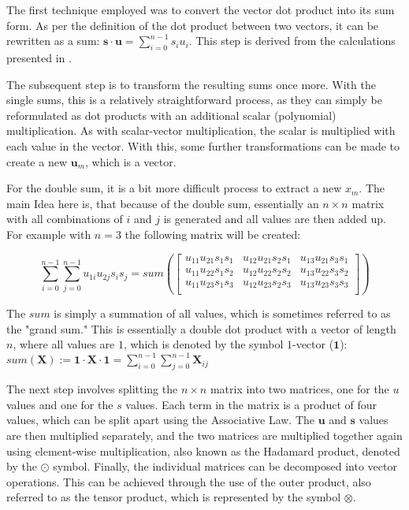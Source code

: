 The first technique employed was to convert the vector dot product into its sum form. As per the definition of the dot product between two vectors, it can be rewritten as a sum: $\textbf{s}\cdot \textbf{u} = \sum_{i=0}^{n-1}s_iu_i$. This step is derived from the calculations presented in \cite{ModHE}.

The subsequent step is to transform the resulting sums once more. With the single sums, this is a relatively straightforward process, as they can simply be reformulated as dot products with an additional scalar (polynomial) multiplication. As with scalar-vector multiplication, the scalar is multiplied with each value in the vector. With this, some further transformations can be made to create a new $\textbf{u}_m$, which is a vector. 

For the double sum, it is a bit more difficult process to extract a new $x_m$. The main Idea here is, that because of the double sum, essentially an $n\times n$ matrix with all combinations of $i$ and $j$ is generated and all values are then added up. For example with $n=3$ the following matrix will be created:

$$
  \sum_{i=0}^{n-1}\sum_{j=0}^{n-1}u_{1i}u_{2j}s_is_j = sum\left(\begin{bmatrix}
      u_{11}u_{21}s_{1}s_{1} & u_{12}u_{21}s_{2}s_{1} & u_{13}u_{21}s_{3}s_{1} \\
      u_{11}u_{22}s_{1}s_{2} & u_{12}u_{22}s_{2}s_{2} & u_{13}u_{22}s_{3}s_{2} \\
      u_{11}u_{23}s_{1}s_{3} & u_{12}u_{23}s_{2}s_{3} & u_{13}u_{23}s_{3}s_{3} \\
    \end{bmatrix}\right)
$$

The $sum$ is simply a summation of all values, which is sometimes referred to as the "grand sum." This is essentially a double dot product with a vector of length $n$, where all values are $1$, which is denoted by the symbol $1$-vector ($\textbf{1}$): $sum(\textbf{X}):= \textbf{1}\cdot \textbf{X} \cdot \textbf{1} = \sum_{i=0}^{n-1}\sum_{j=0}^{n-1} \textbf{X}_{ij}$

The next step involves splitting the $n \times n$ matrix into two matrices, one for the $u$ values and one for the $s$ values. Each term in the matrix is a product of four values, which can be split apart using the Associative Law. The $\textbf{u}$ and $\textbf{s}$ values are then multiplied separately, and the two matrices are multiplied together again using element-wise multiplication, also known as the Hadamard product, denoted by the $\odot$ symbol. Finally, the individual matrices can be decomposed into vector operations. This can be achieved through the use of the outer product, also referred to as the tensor product, which is represented by the symbol $\otimes$.

